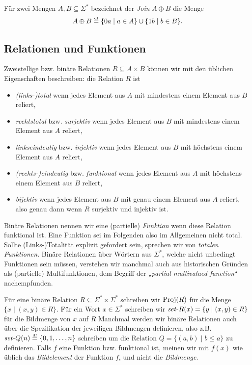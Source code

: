 Für zwei Mengen $A, B\subseteq\Sigma^*$ bezeichnet der \emph{Join} $A\oplus B$ die Menge
\[ A\oplus B \stackrel{\text{\smash{\tiny df}}}{=} \{0a\mid a\in A\} \cup \{1b\mid b\in B\}. \]


\subsection*{Relationen und Funktionen}

Zweistellige bzw. binäre Relationen $R\subseteq A\times B$ können wir mit den üblichen Eigenschaften beschreiben: die Relation $R$ ist
\begin{itemize}[midpenalty=0]
    \item \emph{(links-)total} wenn jedes Element aus $A$ mit mindestens einem Element aus $B$ reliert,
    \item \emph{rechtstotal} bzw. \emph{surjektiv} wenn jedes Element aus $B$ mit mindestens einem Element aus $A$ reliert,
    \item \emph{linkseindeutig} bzw. \emph{injektiv} wenn jedes Element aus $B$ mit höchstens einem Element aus $A$ reliert,
    \item \emph{(rechts-)eindeutig} bzw. \emph{funktional} wenn jedes Element aus $A$ mit höchstens einem Element aus $B$ reliert,
    \item \emph{bijektiv} wenn jedes Element aus $B$ mit genau einem Element aus $A$ reliert, also genau dann wenn $R$ surjektiv und injektiv ist.
\end{itemize}
Binäre Relationen nennen wir eine (partielle) \emph{Funktion} wenn diese Relation funktional ist. Eine Funktion sei im Folgenden also im Allgemeinen nicht total. Sollte (Links-)Totalität explizit gefordert sein, sprechen wir von \emph{totalen Funktionen}.
Binäre Relationen über Wörtern aus $\Sigma^*$, welche nicht unbedingt Funktionen sein müssen, verstehen wir manchmal auch aus historischen Gründen als (partielle) Multifunktionen, dem Begriff der „\emph{partial multivalued function}“ nachempfunden.

Für eine binäre Relation $R\subseteq\Sigma^* \times \Sigma^*$ schreiben wir $\operatorname{Proj}(R)$ für die Menge $\{ x\mid (x,y)\in R \}$. 
Für ein Wort $x\in\Sigma^*$ schreiben wir $\mathit{set}\text{-}{}R(x)=\{ y\mid (x,y)\in R \}$ für die Bildmenge von $x$ auf $R$
Manchmal werden wir binäre Relationen auch über die Spezifikation der jeweiligen Bildmengen definieren, also z.B. $\mathit{set}\text{-}{}Q(n) \stackrel{\text{\smash{\tiny df}}}{=} \{ 0, 1, \dots, n\}$ schreiben um die Relation $Q=\{ (a,b)\mid b\leq a \}$ zu definieren.
Falls $f$ eine Funktion bzw. funktional ist, meinen wir mit $f(x)$ wie üblich das \emph{Bildelement} der Funktion $f$, und nicht die \emph{Bildmenge}. 




